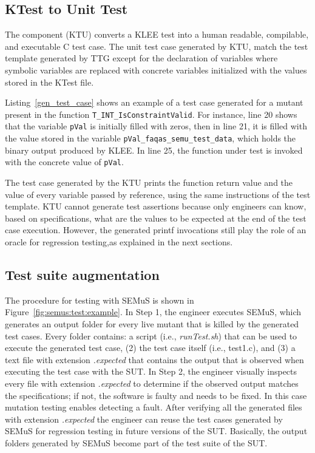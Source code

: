 

\subsection{KTest to Unit Test}





The component  (KTU) converts a KLEE test into a human readable, compilable, and executable C test case. The unit test case generated by KTU, match the test template generated by TTG except for the declaration of variables where symbolic variables are replaced with concrete variables initialized with the values stored in the KTest file.
 
Listing~\ref{gen_test_case} shows an example of a test case generated for a mutant present in the function \texttt{T\_INT\_Is\-ConstraintValid}. For instance, line 20 shows that the variable \texttt{pVal} is initially filled with zeros, then in line 21, it is filled with the value stored in the variable \texttt{pVal\_faqas\_semu\_test\_data}, which holds the binary output produced by KLEE. In line 25, the function under test is invoked with the concrete value of \texttt{pVal}. 

The test case generated by the KTU prints the function return value and the value of every variable passed by reference, using the same instructions of the test template.
KTU cannot generate test assertions because only engineers can know, based on specifications, what are the values to be expected at the end of the test case execution.
However, the generated printf invocations still play the role of an oracle for regression testing,as explained in the next sections.

\subsection{Test suite augmentation} 

The procedure for testing with SEMuS is shown in Figure~\ref{fig:semus:test:example}.
In Step 1, the engineer executes SEMuS, which generates an output folder for every live mutant that is killed by the generated test cases.
Every folder contains: a script (i.e., \emph{runTest.sh}) that can be used to execute the generated test case, (2) the test case itself (i.e., test1.c), and (3) a text file with extension \emph{.expected} that contains the output that is observed when executing the test case with the SUT.
In Step 2, the engineer visually inspects every file with extension \emph{.expected} to determine if the observed output matches the specifications; if not, the software is faulty and needs to be fixed. In this case mutation testing enables detecting a fault. 
After verifying all the generated files with extension \emph{.expected} the engineer can reuse the test cases generated by SEMuS for regression testing in future versions of the SUT. Basically, the output folders generated by SEMuS become part of the test suite of the SUT.


